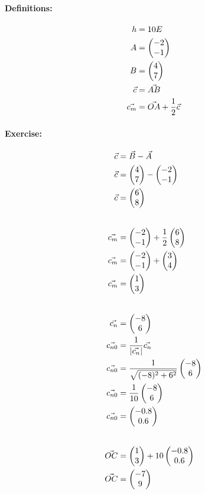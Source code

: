 \documentclass{article}
\begin{document}
\def\ABnorm{\begin{pmatrix}
       -8 \\ 
        6
    \end{pmatrix}}

\def\ABnrommag{\sqrt{(-8)^2 + 6^2}}

\def\ABmidzero{\begin{pmatrix}
   -0.8 \\ 
    0.6
\end{pmatrix}}

\paragraph{Definitions:}
\begin{align*}
    h &= 10 E \\
    A &= \begin{pmatrix} -2 \\ -1 \end{pmatrix} \\
    B &= \begin{pmatrix} 4 \\ 7 \end{pmatrix} \\
    \vec{c} &= \vec{AB} \\
    \vec{c_m} &= \vec{OA} + \frac{1}{2} \vec{c}
\end{align*}

\paragraph{Exercise:}
\begin{align*}
    \vec{c} &= \vec{B} - \vec{A} \\
    \vec{c} &= \B - \A \\
    \vec{c} &= \AB \\[20pt]
    \vec{c_m} &= \A + \frac{1}{2}\AB \\
    \vec{c_m} &= \A  + \ABhalf \\
    \vec{c_m} &= \ABmid \\[20pt]
    \vec{c_n} &= \ABnorm \\
    \vec{c_{n0}} &= \frac{1}{|\vec{c_n}|}\vec{c_n} \\
    \vec{c_{n0}} &= \frac{1}{\ABnrommag}\ABnorm \\
    \vec{c_{n0}} &= \frac{1}{10}\ABnorm \\
    \vec{c_{n0}} &= \ABmidzero \\[20pt]
    \vec{OC} &= \ABmid + \height\ABmidzero \\
    \vec{OC} &= \begin{pmatrix}
       -7 \\ 
        9
    \end{pmatrix}
\end{align*}
\end{document}

